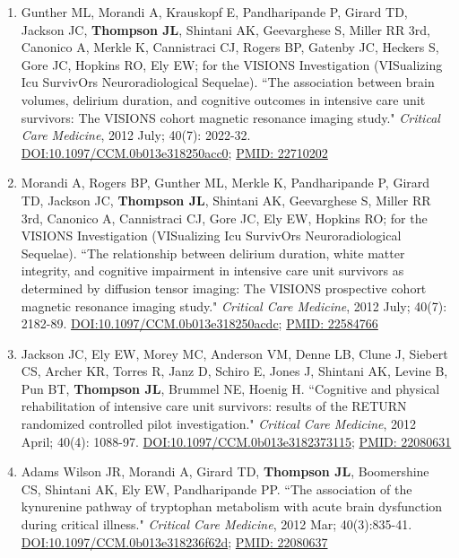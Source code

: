 \documentclass[5pt]{article}
\begin{document}
\begin{enumerate}
\item Gunther ML, Morandi A, Krauskopf E, Pandharipande P, Girard TD, Jackson JC, \textbf{Thompson JL}, Shintani AK, Geevarghese S, Miller RR 3rd, Canonico A, Merkle K, Cannistraci CJ, Rogers BP, Gatenby JC, Heckers S, Gore JC, Hopkins RO, Ely EW; for the VISIONS Investigation (VISualizing Icu SurvivOrs Neuroradiological Sequelae). ``The association between brain volumes, delirium duration, and cognitive outcomes in intensive care unit survivors: The VISIONS cohort magnetic resonance imaging study." \emph{Critical Care Medicine}, 2012 July; 40(7): 2022-32. \href{https://doi.org/10.1097/CCM.0b013e318250acc0}{DOI:10.1097/CCM.0b013e318250acc0}; \href{https://www.ncbi.nlm.nih.gov/pubmed/22710202}{PMID: 22710202}
\item Morandi A, Rogers BP, Gunther ML, Merkle K, Pandharipande P, Girard TD, Jackson JC, \textbf{Thompson JL}, Shintani AK, Geevarghese S, Miller RR 3rd, Canonico A, Cannistraci CJ, Gore JC, Ely EW, Hopkins RO; for the VISIONS Investigation (VISualizing Icu SurvivOrs Neuroradiological Sequelae). ``The relationship between delirium duration, white matter integrity, and cognitive impairment in intensive care unit survivors as determined by diffusion tensor imaging: The VISIONS prospective cohort magnetic resonance imaging study." \emph{Critical Care Medicine}, 2012 July; 40(7): 2182-89. \href{https://doi.org/10.1097/CCM.0b013e318250acdc}{DOI:10.1097/CCM.0b013e318250acdc}; \href{https://www.ncbi.nlm.nih.gov/pubmed/22584766}{PMID: 22584766}
\item Jackson JC, Ely EW, Morey MC, Anderson VM, Denne LB, Clune J, Siebert CS, Archer KR, Torres R, Janz D, Schiro E, Jones J, Shintani AK, Levine B, Pun BT, \textbf{Thompson JL}, Brummel NE, Hoenig H. ``Cognitive and physical rehabilitation of intensive care unit survivors: results of the RETURN randomized controlled pilot investigation." \emph{Critical Care Medicine}, 2012 April; 40(4): 1088-97. \href{https://doi.org/10.1097/CCM.0b013e3182373115}{DOI:10.1097/CCM.0b013e3182373115}; \href{https://www.ncbi.nlm.nih.gov/pubmed/22080631}{PMID: 22080631}
\item Adams Wilson JR, Morandi A, Girard TD, \textbf{Thompson JL}, Boomershine CS, Shintani AK, Ely EW, Pandharipande PP. ``The association of the kynurenine pathway of tryptophan metabolism with acute brain dysfunction during critical illness." \emph{Critical Care Medicine}, 2012 Mar; 40(3):835-41. \href{https://doi.org/10.1097/CCM.0b013e318236f62d}{DOI:10.1097/CCM.0b013e318236f62d}; \href{https://www.ncbi.nlm.nih.gov/pubmed/22080637}{PMID: 22080637}

\end{enumerate}
\end{document}
